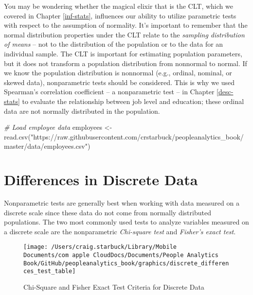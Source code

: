 \documentclass[
]{book}
\newenvironment{Shaded}{\begin{snugshade}}{\end{snugshade}}
\newcommand{\CommentTok}[1]{\textcolor[rgb]{0.56,0.35,0.01}{\textit{#1}}}
\newcommand{\FunctionTok}[1]{\textcolor[rgb]{0.00,0.00,0.00}{#1}}
\newcommand{\NormalTok}[1]{#1}
\newcommand{\OtherTok}[1]{\textcolor[rgb]{0.56,0.35,0.01}{#1}}
\newcommand{\StringTok}[1]{\textcolor[rgb]{0.31,0.60,0.02}{#1}}
\begin{document}
You may be wondering whether the magical elixir that is the CLT, which we covered in Chapter \ref{inf-stats}, influences our ability to utilize parametric tests with respect to the assumption of normality. It's important to remember that the normal distribution properties under the CLT relate to the \emph{sampling distribution of means} -- not to the distribution of the population or to the data for an individual sample. The CLT is important for estimating population parameters, but it does not transform a population distribution from nonnormal to normal. If we know the population distribution is nonnormal (e.g., ordinal, nominal, or skewed data), nonparametric tests should be considered. This is why we used Spearman's correlation coefficient -- a nonparametric test -- in Chapter \ref{desc-stats} to evaluate the relationship between job level and education; these ordinal data are not normally distributed in the population.

\begin{Shaded}
\begin{Highlighting}[]
\CommentTok{\# Load employee data}
\NormalTok{employees }\OtherTok{\textless{}{-}} \FunctionTok{read.csv}\NormalTok{(}\StringTok{"https://raw.githubusercontent.com/crstarbuck/peopleanalytics\_book/master/data/employees.csv"}\NormalTok{)}
\end{Highlighting}
\end{Shaded}

\hypertarget{differences-in-discrete-data}{%
\section{Differences in Discrete Data}\label{differences-in-discrete-data}}

Nonparametric tests are generally best when working with data measured on a discrete scale since these data do not come from normally distributed populations. The two most commonly used tests to analyze variables measured on a discrete scale are the nonparametric \emph{Chi-square test} and \emph{Fisher's exact test}.

\begin{figure}

{\centering \texttt{[image: /Users/craig.starbuck/Library/Mobile Documents/com~apple~CloudDocs/Documents/People Analytics Book/GitHub/peopleanalytics\_book/graphics/discrete\_differences\_test\_table]} 

}

\caption{Chi-Square and Fisher Exact Test Criteria for Discrete Data}\label{fig:discrete-tests}
\end{figure}
\end{document}

